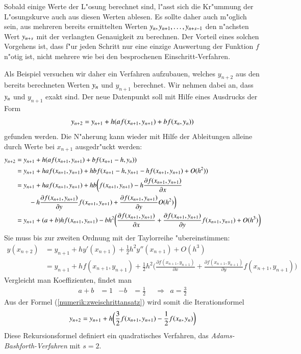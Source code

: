 Sobald einige Werte der L"osung berechnet sind, l"asst sich die Kr"ummung
der L"osungskurve auch aus diesen Werten ablesen.
Es sollte daher auch m"oglich sein, aus mehreren bereits
ermittelten Werten $y_{n\mathstrut},y_{n+1},\dots,y_{n+s-1}$
den n"achsten Wert $y_{n+s\mathstrut}$ mit der verlangten Genauigkeit
zu berechnen.
Der Vorteil eines solchen Vorgehens ist, dass f"ur jeden Schritt nur 
eine einzige Auswertung der Funktion $f$ n"otig ist,
nicht mehrere wie bei den besprochenen Einschritt-Verfahren.

Als Beispiel versuchen wir daher ein Verfahren aufzubauen, welches
$y_{n+2}$ aus den bereits berechneten Werten $y_{n\mathstrut}$ und
$y_{n+1}$ berechnet.
Wir nehmen dabei an, dass $y_{n\mathstrut}$ und $y_{n+1}$ exakt
sind.
Der neue Datenpunkt soll mit Hilfe eines Ausdrucks der Form
\begin{equation}
y_{n+2}=y_{n+1} + h(af(x_{n+1},y_{n+1}) + b f(x_{n\mathstrut},y_{n\mathstrut}))
\label{numerik:zweischrittansatz}
\end{equation}
gefunden werden.
Die N"aherung kann wieder mit Hilfe der Ableitungen alleine
durch Werte bei $x_{n+1}$ ausgedr"uckt werden:
\begin{align*}
y_{n+2}
&=
y_{n+1}+h(af(x_{n+1}, y_{n+1}) + bf(x_{n+1}-h, y_{n\mathstrut}))
\\
&=
y_{n+1}+haf(x_{n+1}, y_{n+1}) + hbf(x_{n+1}-h, y_{n+1} - h f(x_{n+1},y_{n+1}) + O(h^2))
\\
&=
y_{n+1}+haf(x_{n+1}, y_{n+1}) + hb
\biggl(
f(x_{n+1},y_{n+1})
-h \frac{\partial f(x_{n+1},y_{n+1})}{\partial x}
\\
&\qquad
-h
\frac{\partial f(x_{n+1},y_{n+1})}{\partial y}
f(x_{n+1},y_{n+1})
+ 
\frac{\partial f(x_{n+1},y_{n+1})}{\partial y}
O(h^2)
\biggr)
\\
&=
y_{n+1}
+ (a+b)hf(x_{n+1},y_{n+1})
- bh^2\biggl(
\frac{\partial f(x_{n+1},y_{n+1})}{\partial x}
+
\frac{\partial f(x_{n+1},y_{n+1})}{\partial y}
f(x_{n+1},y_{n+1})
+O(h^3)
\biggr)
\end{align*}
Sie muss bis zur zweiten Ordnung mit der Taylorreihe "ubereinstimmen:
\begin{align*}
y(x_{n+2})
&=
y_{n+1} + hy'(x_{n+1}) + \frac12h^2 y''(x_{n+1})+O(h^3)
\\
&=
y_{n+1}+hf(x_{n+1},y_{n+1})+\frac12h^2\biggl(
\frac{\partial f(x_{n+1},y_{n+1})}{\partial x}
+
\frac{\partial f(x_{n+1},y_{n+1})}{\partial y}
f(x_{n+1},y_{n+1})
\biggr)
\end{align*}
Vergleicht man Koeffizienten, findet man
\[
\begin{aligned}
a+b&=1&-b&=\frac12&&\Rightarrow&a=\frac32
\end{aligned}
\]
Aus der Formel (\ref{numerik:zweischrittansatz}) wird somit die
Iterationsformel
\begin{equation}
y_{n+2}=y_{n+1}+h\biggl(\frac32f(x_{n+1},y_{n+1})
- \frac12 f(x_{n\mathstrut},y_{n\mathstrut})\biggr)
\end{equation}
Diese Rekursionsformel definiert ein quadratisches Verfahren, das
{\em Adams-Bashforth-Verfahren} mit $s=2$.

